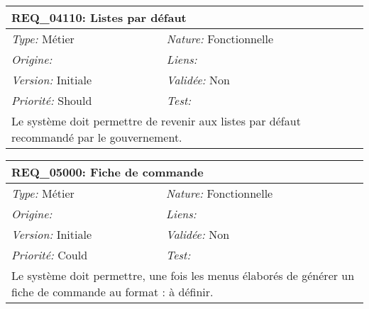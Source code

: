 \begin{table}[!ht]

\begin{tabular}{|p{60mm}p{100mm}|}

\hline

\multicolumn{2}{|l|}{\textbf{REQ\_04110:} Listes par défaut} \\ \hline

\emph{Type:} Métier & \emph{Nature:} Fonctionnelle \\

\emph{Origine:}  & \emph{Liens:}  \\

\emph{Version:} Initiale & \emph{Validée:} Non \\

\emph{Priorité:} Should & \emph{Test:} \\ \hline

\multicolumn{2}{|p{16cm}|}{Le système doit permettre de revenir aux listes par défaut recommandé par le gouvernement.} \\ \hline

\end{tabular}

\end{table}



\begin{table}[!ht]

\begin{tabular}{|p{60mm}p{100mm}|}

\hline

\multicolumn{2}{|l|}{\textbf{REQ\_05000:} Fiche de commande} \\ \hline

\emph{Type:} Métier & \emph{Nature:} Fonctionnelle \\

\emph{Origine:}  & \emph{Liens:}  \\

\emph{Version:} Initiale & \emph{Validée:} Non \\

\emph{Priorité:} Could & \emph{Test:} \\ \hline

\multicolumn{2}{|p{16cm}|}{Le système doit permettre, une fois les menus élaborés de générer un fiche de commande au format : à définir.} \\ \hline

\end{tabular}

\end{table}



